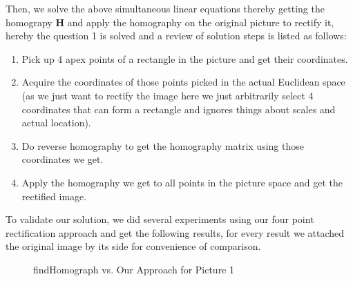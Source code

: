 \documentclass[conference]{IEEEtran}
\newcommand{\mat}[1]{\mathbf{#1}} %
\begin{document}
\noindent Then, we solve the above simultaneous linear equations thereby getting the homograpy $\mat{H}$ and apply the homography on the original picture to rectify it, hereby the question 1 is solved and a review of solution steps is listed as follows:
\begin{enumerate}
	\item Pick up 4 apex points of a rectangle in the picture and get their coordinates.
	\item Acquire the coordinates of those points picked in the actual Euclidean space (as we just want to rectify the image here we just arbitrarily select 4 coordinates that can form a rectangle and ignores things about scales and actual location).
	\item Do reverse homography to get the homography matrix using those coordinates we get.
	\item Apply the homography we get to all points in the picture space and get the rectified image.
\end{enumerate}

To validate our solution, we did several experiments using our four point rectification approach and get the following results, for every result we attached the original image by its side for convenience of comparison. 
\begin{figure*}
  \centering
  \caption{findHomograph vs. Our Approach for Picture 1}
  \label{four-point-comparison-1} %
\end{figure*}
\end{document}
